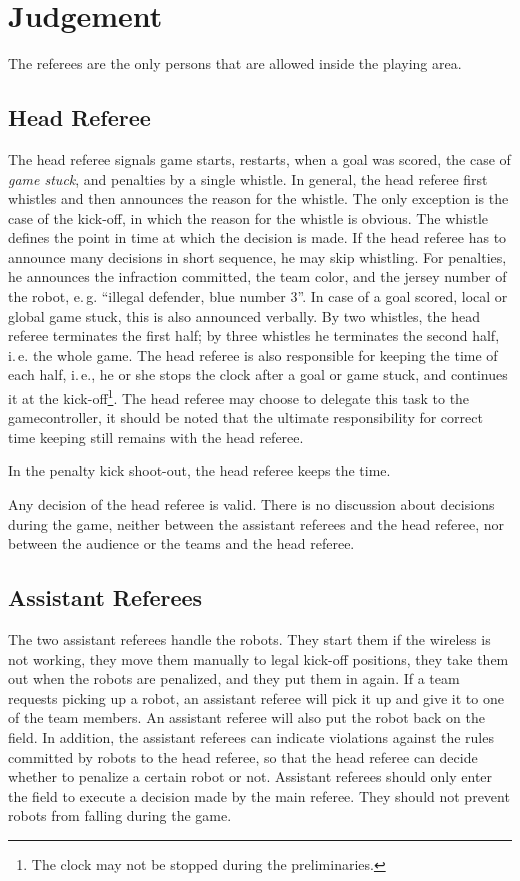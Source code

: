 \documentclass[12pt]{article}
\newcommand{\ie}{\mbox{i.\,e.}\xspace}
\newcommand{\eg}{\mbox{e.\,g.}\xspace}
\begin{document}
\section{Judgement}

The referees are the only persons that are allowed inside the
playing area.

\subsection{Head Referee}

The head referee signals game starts, restarts, when a goal was
scored, the case of \emph{game stuck}, and penalties by a single
whistle. In general, the head referee first whistles and then
announces the reason for the whistle. The only exception is the case
of the kick-off, in which the reason for the whistle is obvious. The
whistle defines the point in time at which the decision is made. If
the head referee has to announce many decisions in short sequence,
he may skip whistling. For penalties, he announces the infraction
committed, the team color, and the jersey number of the robot, \eg
``illegal defender, blue number 3''. In case of a goal scored, local
or global game stuck, this is also announced verbally. By two
whistles, the head referee terminates the first half; by three
whistles he terminates the second half, \ie the whole game. The head
referee is also responsible for keeping the time of each half, \ie,
he or she stops the clock after a goal or game stuck, and continues
it at the kick-off\footnote{The clock may not be stopped during the
preliminaries.}. The head referee may choose to delegate this task
to the gamecontroller, it should be noted that the ultimate
responsibility for correct time keeping still remains with the head
referee.

In the penalty kick shoot-out, the head referee keeps the time.

Any decision of the head referee is valid. There is no discussion
about decisions during the game, neither between the assistant
referees and the head referee, nor between the audience or the teams
and the head referee.

\subsection{Assistant Referees}

The two assistant referees handle the robots. They start them if the
wireless is not working, they move them manually to legal kick-off
positions, they take them out when the robots are penalized, and
they put them in again. If a team requests picking up a robot, an
assistant referee will pick it up and give it to one of the team
members. An assistant referee will also put the robot back on the
field. In addition, the assistant referees can indicate violations
against the rules committed by robots to the head referee, so that
the head referee can decide whether to penalize a certain robot or
not. Assistant referees should only enter the field to execute a decision made by the main referee. They should not prevent robots from falling during the game.
\end{document}
